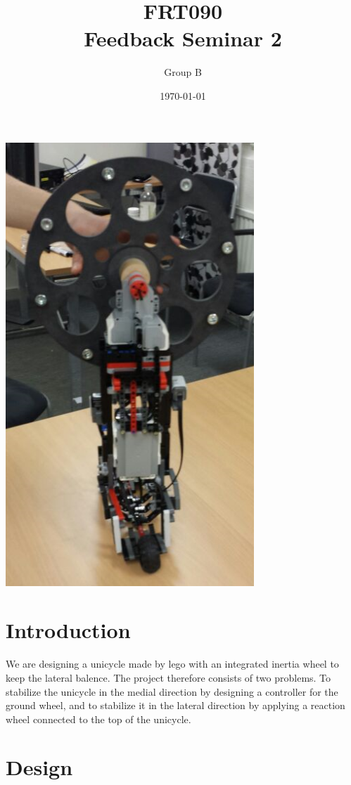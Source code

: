 \documentclass[a4paper]{article}
\title{
FRT090  \\
Feedback Seminar 2\\}
\author{Group B}
\date{\today}
\begin{document}
\maketitle



\includegraphics[width=0.7\textwidth]{inwheel}

\newpage

\section{Introduction}

We are designing a unicycle made by lego with an integrated inertia wheel to keep the lateral balence. The project therefore consists of two problems. To stabilize the unicycle in the medial direction by designing a controller for the ground wheel, and to stabilize it in the lateral direction by applying a reaction wheel connected to the top of the unicycle.

\section{Design}
\end{document}
